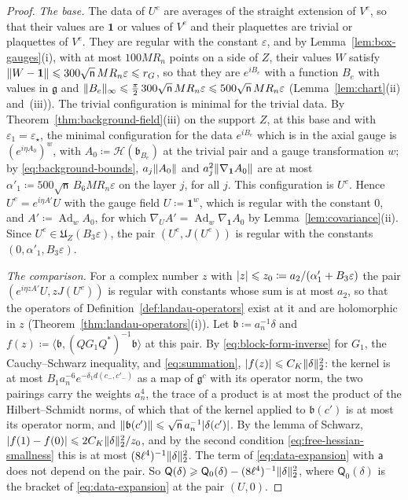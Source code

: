 \documentclass[11pt]{preprint}
\newcommand{\id}{\mathbf 1}
\newcommand{\Ad}{\operatorname{Ad}}
\DeclarePairedDelimiter{\abs}{\lvert}{\rvert}
\DeclarePairedDelimiter{\norm}{\lVert}{\rVert}
\numberwithin{equation}{section}
\begin{document}
\begin{proof}
\emph{The base.} The data of $U^e$ are averages of the straight extension of $V^e$, so that their values are $\id$ or values of $V^e$ and their plaquettes are trivial or plaquettes of $V^e$. They are regular with the constant $\varepsilon$, and by Lemma~\ref{lem:box-gauges}(i), with at most $100MR_n$ points on a side of $Z$, their values $W$ satisfy $\norm{W - \id} \leqslant 300\sqrt{\mathsf n}\,MR_n\varepsilon \leqslant r_G$, so that they are $e^{iB_e}$ with a function $B_e$ with values in $\mathfrak g$ and $\norm{B_e}_\infty \leqslant \frac{\pi}{2}\,300\sqrt{\mathsf n}\,MR_n\varepsilon \leqslant 500\sqrt{\mathsf n}\,MR_n\varepsilon$ (Lemma~\ref{lem:chart}(ii) and~(iii)). The trivial configuration is minimal for the trivial data. By Theorem~\ref{thm:background-field}(iii) on the support $Z$, at this base and with $\varepsilon_1 = \varepsilon_\star$, the minimal configuration for the data $e^{iB_e}$ which is in the axial gauge is $(e^{i\eta A_0})^w$, with $A_0 \coloneqq \mathcal H(\mathfrak b_{B_e})$ at the trivial pair and a gauge transformation $w$; by \eqref{eq:background-bounds}, $a_j\norm{A_0}$ and $a_j^2\norm{\nabla_{\id}A_0}$ are at most $\alpha'_1 \coloneqq 500\sqrt{\mathsf n}\,B_6MR_n\varepsilon$ on the layer $j$, for all $j$. This configuration is $U^e$. Hence $U^e = e^{i\eta A'}U$ with the gauge field $U \coloneqq \id^w$, which is regular with the constant $0$, and $A' \coloneqq \Ad_wA_0$, for which $\nabla_UA' = \Ad_w\nabla_{\id}A_0$ by Lemma~\ref{lem:covariance}(ii). Since $U^e \in \mathfrak U_Z(B_3\varepsilon)$, the pair $(U^e, J(U^e))$ is regular with the constants $(0, \alpha'_1, B_3\varepsilon)$.

\emph{The comparison.} For a complex number $z$ with $\abs z \leqslant z_0 \coloneqq a_2/(\alpha'_1 + B_3\varepsilon)$ the pair $(e^{i\eta zA'}U, zJ(U^e))$ is regular with constants whose sum is at most $a_2$, so that the operators of Definition~\ref{def:landau-operators} exist at it and are holomorphic in $z$ (Theorem~\ref{thm:landau-operators}(i)). Let $\mathfrak b \coloneqq a_n^{-1}\delta$ and $f(z) \coloneqq \langle\mathfrak b, (QG_1Q^*)^{-1}\mathfrak b\rangle$ at this pair. By \eqref{eq:block-form-inverse} for $G_1$, the Cauchy--Schwarz inequality, and \eqref{eq:summation}, $\abs{f(z)} \leqslant C_K\norm\delta_2^2$: the kernel is at most $B_1a_n^{-6}e^{-\delta_1d(c_-, c'_-)}$ as a map of $\mathfrak g^c$ with its operator norm, the two pairings carry the weights $a_n^4$, the trace of a product is at most the product of the Hilbert--Schmidt norms, of which that of the kernel applied to $\mathfrak b(c')$ is at most its operator norm, and $\norm{\mathfrak b(c')} \leqslant \sqrt{\mathsf n}\,a_n^{-1}\abs{\delta(c')}$. By the lemma of Schwarz, $\abs{f(1) - f(0)} \leqslant 2C_K\norm\delta_2^2/z_0$, and by the second condition \eqref{eq:free-hessian-smallness} this is at most $(8\ell^4)^{-1}\norm\delta_2^2$. The term of \eqref{eq:data-expansion} with $\mathsf a$ does not depend on the pair. So $\mathsf Q(\delta) \geqslant \mathsf Q_0(\delta) - (8\ell^4)^{-1}\norm\delta_2^2$, where $\mathsf Q_0(\delta)$ is the bracket of \eqref{eq:data-expansion} at the pair $(U, 0)$.


\end{proof}
\end{document}
